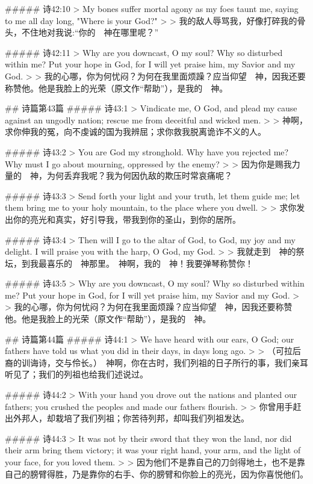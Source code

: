 ##### 诗42:10
> My bones suffer mortal agony as my foes taunt me, saying to me all day long, "Where is your God?"
>
> 我的敌人辱骂我，好像打碎我的骨头，不住地对我说:“你的　神在哪里呢？”


##### 诗42:11
> Why are you downcast, O my soul? Why so disturbed within me? Put your hope in God, for I will yet praise him, my Savior and my God.
>
> 我的心哪，你为何忧闷？为何在我里面烦躁？应当仰望　神，因我还要称赞他。他是我脸上的光荣（原文作“帮助”），是我的　神。


## 诗篇第43篇
##### 诗43:1
> Vindicate me, O God, and plead my cause against an ungodly nation; rescue me from deceitful and wicked men.
>
> 神啊，求你伸我的冤，向不虔诚的国为我辨屈；求你救我脱离诡诈不义的人。


##### 诗43:2
> You are God my stronghold. Why have you rejected me? Why must I go about mourning, oppressed by the enemy?
>
> 因为你是赐我力量的　神，为何丢弃我呢？我为何因仇敌的欺压时常哀痛呢？


##### 诗43:3
> Send forth your light and your truth, let them guide me; let them bring me to your holy mountain, to the place where you dwell.
>
> 求你发出你的亮光和真实，好引导我，带我到你的圣山，到你的居所。


##### 诗43:4
> Then will I go to the altar of God, to God, my joy and my delight. I will praise you with the harp, O God, my God.
>
> 我就走到　神的祭坛，到我最喜乐的　神那里。　神啊，我的　神！我要弹琴称赞你！


##### 诗43:5
> Why are you downcast, O my soul? Why so disturbed within me? Put your hope in God, for I will yet praise him, my Savior and my God.
>
> 我的心哪，你为何忧闷？为何在我里面烦躁？应当仰望　神，因我还要称赞他。他是我脸上的光荣（原文作“帮助”），是我的　神。


## 诗篇第44篇
##### 诗44:1
> We have heard with our ears, O God; our fathers have told us what you did in their days, in days long ago.
>
> （可拉后裔的训诲诗，交与伶长。）　神啊，你在古时，我们列祖的日子所行的事，我们亲耳听见了；我们的列祖也给我们述说过。


##### 诗44:2
> With your hand you drove out the nations and planted our fathers; you crushed the peoples and made our fathers flourish.
>
> 你曾用手赶出外邦人，却栽培了我们列祖；你苦待列邦，却叫我们列祖发达。


##### 诗44:3
> It was not by their sword that they won the land, nor did their arm bring them victory; it was your right hand, your arm, and the light of your face, for you loved them.
>
> 因为他们不是靠自己的刀剑得地土，也不是靠自己的膀臂得胜，乃是靠你的右手、你的膀臂和你脸上的亮光，因为你喜悦他们。


